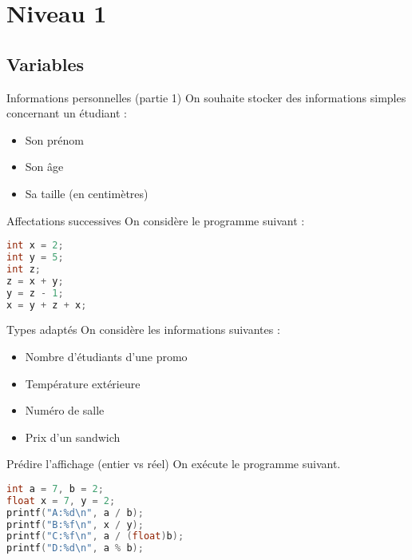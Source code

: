 \section{Niveau 1}
\subsection{Variables}
\begin{UPSTIexercice}{Informations personnelles (partie 1)}
    On souhaite stocker des informations simples concernant un étudiant :
    \begin{itemize}
        \item Son prénom
        \item Son âge
        \item Sa taille (en centimètres)
    \end{itemize}
\end{UPSTIexercice}

\begin{UPSTIexercice}{Affectations successives}
    On considère le programme suivant :
    \begin{lstlisting}[language=C]
int x = 2;
int y = 5;
int z;
z = x + y;
y = z - 1;
x = y + z + x;
\end{lstlisting}
\end{UPSTIexercice}


\begin{UPSTIexercice}{Types adaptés}
On considère les informations suivantes :
\begin{itemize}
    \item Nombre d'étudiants d'une promo
    \item Température extérieure
    \item Numéro de salle
    \item Prix d'un sandwich
\end{itemize}

\end{UPSTIexercice}

\begin{UPSTIexercice}{Prédire l'affichage (entier vs réel)}
On exécute le programme suivant.
\begin{lstlisting}[language=C]
int a = 7, b = 2;
float x = 7, y = 2;
printf("A:%d\n", a / b);
printf("B:%f\n", x / y);
printf("C:%f\n", a / (float)b);
printf("D:%d\n", a % b);
\end{lstlisting}

\end{UPSTIexercice}



